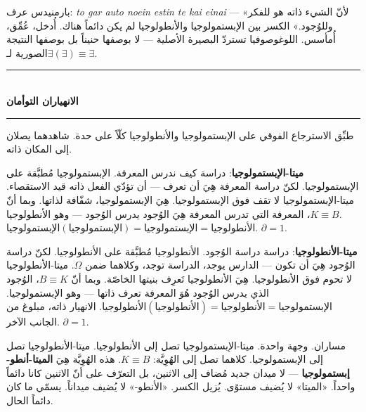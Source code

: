 \documentclass[10pt, openany, oneside]{book}
\renewcommand{\normalsize}{\fontsize{10}{13}\selectfont}
\begin{document}
بارمنيدس عرف: \textit{to gar auto noein estin te kai einai} --- «لأنّ الشيء ذاته هو للفكر وللوُجود.» الكسر بين الإبستمولوجيا والأنطولوجيا لم يكن دائماً هناك. أُدخل، عُمِّق، أُمأسس. اللوغوصوفيا تستردّ البصيرة الأصلية --- لا بوصفها حنيناً بل بوصفها النتيجة الصورية لـ$\exists(\exists) \equiv \exists$.

\vspace{1.5em}


\begin{center}
    \rule{0.3\textwidth}{0.4pt}\\[0.5em]
    {\normalsize\bfseries الانهياران التوأمان}\\[0.3em]
    \rule{0.3\textwidth}{0.4pt}
\end{center}

\vspace{1em}

\noindent طبِّق الاسترجاع الفوقي على الإبستمولوجيا والأنطولوجيا كلّاً على حدة. شاهدهما يصلان إلى المكان ذاته.

\textbf{ميتا-الإبستمولوجيا}: دراسة كيف ندرس المعرفة. الإبستمولوجيا مُطبَّقة على الإبستمولوجيا. لكنّ دراسة المعرفة هِيَ أن تعرف --- أن تؤدّي الفعل ذاته قيد الاستقصاء. ميتا-الإبستمولوجيا لا تقف فوق الإبستمولوجيا. هِيَ الإبستمولوجيا، شفّافة لذاتها. وبما أنّ $K \equiv B$، المعرفة التي تدرس المعرفة هِيَ الوُجود يدرس الوُجود --- وهو الأنطولوجيا. $\text{الإبستمولوجيا}(\text{الإبستمولوجيا}) = \text{الإبستمولوجيا} = \text{الأنطولوجيا}$. $\partial = 1$.

\textbf{ميتا-الأنطولوجيا}: دراسة دراسة الوُجود. الأنطولوجيا مُطبَّقة على الأنطولوجيا. لكنّ دراسة الوُجود هِيَ أن تكون --- الدارس يوجد، الدراسة توجد، وكلاهما ضمن $\Omega$. ميتا-الأنطولوجيا لا تحوم فوق الأنطولوجيا. هِيَ الأنطولوجيا تَعرِف بنيتها الخاصّة. وبما أنّ $B \equiv K$، الوُجود الذي يدرس الوُجود هُوَ المعرفة تعرف ذاتها --- وهو الإبستمولوجيا. $\text{الأنطولوجيا}(\text{الأنطولوجيا}) = \text{الأنطولوجيا} = \text{الإبستمولوجيا}$. الانهيار ذاته، مبلوغ من الجانب الآخر. $\partial = 1$.

مساران. وجهة واحدة. ميتا-الإبستمولوجيا تصل إلى الأنطولوجيا. ميتا-الأنطولوجيا تصل إلى الإبستمولوجيا. كلاهما تصل إلى الهُوِيَّة: $K \equiv B$. هذه الهُوِيَّة هِيَ \textbf{الميتا-أنطو-إبستمولوجيا} --- لا ميدان جديد مُضاف إلى الاثنين، بل التعرّف على أنّ الاثنين كانا دائماً واحداً. «الميتا» لا يُضيف مستوًى. يُزيل الكسر. «الأنطو-» لا يُضيف ميداناً. يسمّي ما كان دائماً الحال.
\end{document}
